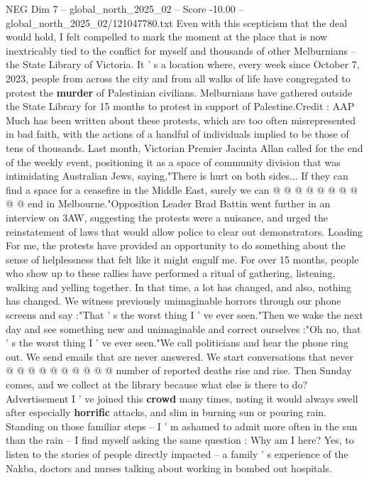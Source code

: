 \begin{textsample}{NEG Dim 7 – global\_north\_2025\_02 – Score -10.00 – global\_north\_2025\_02/121047780.txt}  \label{ex:f7_neg_065}
Even with this scepticism that the deal would hold, I felt compelled to mark the moment at the place that is now inextricably tied to the conflict for myself and thousands of other Melburnians -- the State Library of Victoria.
It ' s a location where, every week since October 7, 2023, people from across the city and from all walks of life have congregated to protest the \textbf{murder} of Palestinian civilians.
Melburnians have gathered outside the State Library for 15 months to protest in support of Palestine.Credit : AAP Much has been written about these protests, which are too often misrepresented in bad faith, with the actions of a handful of individuals implied to be those of tens of thousands.
Last month, Victorian Premier Jacinta Allan called for the end of the weekly event, positioning it as a space of community division that was intimidating Australian Jews, saying,"There is hurt on both sides...
If they can find a space for a ceasefire in the Middle East, surely we can @ @ @ @ @ @ @ @ @ @ end in Melbourne."Opposition Leader Brad Battin went further in an interview on 3AW, suggesting the protests were a nuisance, and urged the reinstatement of laws that would allow police to clear out demonstrators.
Loading For me, the protests have provided an opportunity to do something about the sense of helplessness that felt like it might engulf me.
For over 15 months, people who show up to these rallies have performed a ritual of gathering, listening, walking and yelling together.
In that time, a lot has changed, and also, nothing has changed.
We witness previously unimaginable horrors through our phone screens and say :"That ' s the worst thing I ' ve ever seen."Then we wake the next day and see something new and unimaginable and correct ourselves :"Oh no, that ' s the worst thing I ' ve ever seen."We call politicians and hear the phone ring out.
We send emails that are never answered.
We start conversations that never @ @ @ @ @ @ @ @ @ @ number of reported deaths rise and rise.
Then Sunday comes, and we collect at the library because what else is there to do?
Advertisement I ' ve joined this \textbf{crowd} many times, noting it would always swell after especially \textbf{horrific} attacks, and slim in burning sun or pouring rain.
Standing on those familiar steps -- I ' m ashamed to admit more often in the sun than the rain -- I find myself asking the same question : Why am I here?
Yes, to listen to the stories of people directly impacted -- a family ' s experience of the Nakba, doctors and nurses talking about working in bombed out hospitals.

\end{textsample}
